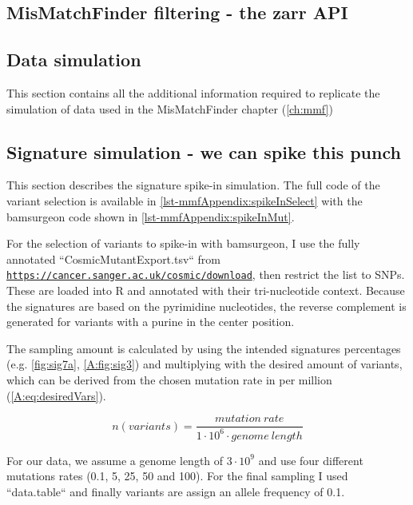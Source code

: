 \subsection{MisMatchFinder filtering - the zarr API}
\label{ch-mmfAppendix:filter}

\subsection{Data simulation}
\label{ch-mmfAppendix:simulation}
This section contains all the additional information required to replicate the simulation of data used in the MisMatchFinder chapter (\autoref{ch:mmf})

\subsection{Signature simulation - we can spike this punch}
\label{ch-mmfAppendix:spikein}
This section describes the signature spike-in simulation. The full code of the variant selection is available in \autoref{lst-mmfAppendix:spikeInSelect} with the bamsurgeon code shown in \autoref{lst-mmfAppendix:spikeInMut}.

For the selection of variants to spike-in with bamsurgeon, I use the fully annotated ``CosmicMutantExport.tsv`` from \href{https://cancer.sanger.ac.uk/cosmic/download}{\nolinkurl{https://cancer.sanger.ac.uk/cosmic/download}}, then restrict the list to SNPs. These are loaded into R and annotated with their tri-nucleotide context. Because the signatures are based on the pyrimidine nucleotides, the reverse complement is generated for variants with a purine in the center position.

The sampling amount is calculated by using the intended signatures percentages (e.g. \autoref{fig:sig7a}, \autoref{A:fig:sig3}) and multiplying with the desired amount of variants, which can be derived from the chosen mutation rate in per million (\autoref{A:eq:desiredVars}).

\begin{equation}
n(variants) = \frac{mutation~rate}{1\cdot10^{6} \cdot genome~length}
\label{A:eq:desiredVars}
\end{equation}

For our data, we assume a genome length of $3 \cdot 10^9$ and use four different mutations rates (0.1, 5, 25, 50 and 100). For the final sampling I used ``data.table`` and finally variants are assign an allele frequency of 0.1.


